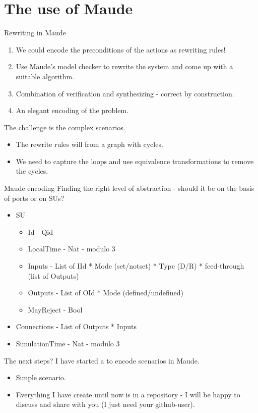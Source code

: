 \documentclass{beamer}
\begin{document}
\section{The use of Maude}

\begin{frame}{Rewriting in Maude}
    \begin{enumerate}
        \item We could encode the preconditions of the actions as rewriting rules!
        \item Use Maude's model checker to rewrite the system and come up with a suitable algorithm.
        \item Combination of verification and synthesizing - correct by construction. 
        \item An elegant encoding of the problem.
    \end{enumerate}

    The challenge is the complex scenarios.
    \begin{itemize}
        \item The rewrite rules will from a graph with cycles.
        \item We need to capture the loops and use equivalence transformations to remove the cycles.
    \end{itemize}
\end{frame}

\begin{frame}{Maude encoding}
    Finding the right level of abstraction - should it be on the basis of ports or on SUs?
\begin{itemize}
    \item SU
    \begin{itemize}
        \item Id - Qid
        \item LocalTime - Nat - modulo 3
        \item Inputs - List of IId * Mode (set/notset) * Type (D/R) * feed-through (list of Outputs)
        \item Outputs - List of OId * Mode (defined/undefined)
        \item MayReject - Bool
    \end{itemize}
    \item Connections - List of Outputs * Inputs
    \item SimulationTime - Nat - modulo 3
\end{itemize}
\end{frame}

\begin{frame}{The next steps?}
    I have started a to encode scenarios in Maude.
    \begin{itemize}
        \item Simple scenario.
        \item Everything I have create until now is in a repository - I will be happy to discuss and share with you (I just need your github-user).
        
    \end{itemize}   
\end{frame}
\end{document}
